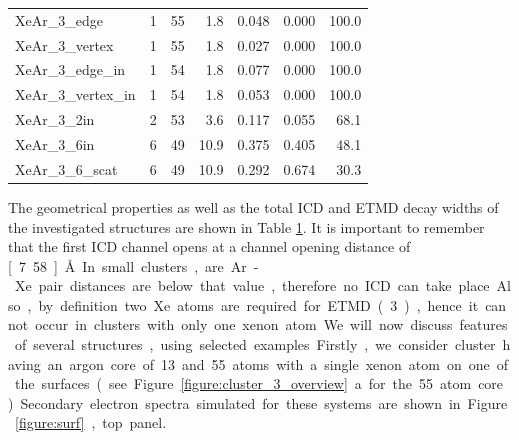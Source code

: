 \begin{table}[h]
\begin{tabular}{lrrrccr}
XeAr\_3\_edge        &      1   &     55   &  1.8  & 0.048 & 0.000 & 100.0\\ %
XeAr\_3\_vertex      &      1   &     55   &  1.8  & 0.027 & 0.000 & 100.0\\ %
XeAr\_3\_edge\_in    &      1   &     54   &  1.8  & 0.077 & 0.000 & 100.0\\ %
XeAr\_3\_vertex\_in  &      1   &     54   &  1.8  & 0.053 & 0.000 & 100.0\\ %
XeAr\_3\_2in         &      2   &     53   &  3.6  & 0.117 & 0.055 &  68.1\\ %
XeAr\_3\_6in         &      6   &     49   & 10.9  & 0.375 & 0.405 &  48.1\\ %
XeAr\_3\_6\_scat     &      6   &     49   & 10.9  & 0.292 & 0.674 &  30.3\\ %
\bottomrule
\end{tabular}
\label{table:theo_gammas}
\end{table}
%
The geometrical properties as well as the total ICD and ETMD decay widths
of the investigated structures are shown in Table \ref{table:theo_gammas}.
It is important to remember that the first ICD channel opens at a
channel opening distance of \unit[7.58]{\AA}. In small
clusters, are Ar-Xe pair distances are below that value, therefore 
no ICD can take place. Also, by definition two Xe atoms are
required for ETMD(3), hence it cannot occur in clusters with only one xenon atom.
%

We will now discuss features of several structures, using selected examples.

Firstly, we consider cluster having an argon core of 13 and 55 atoms with a single xenon
atom on one of the surfaces (see Figure \ref{figure:cluster_3_overview}a
for the 55 atom core).
Secondary electron spectra simulated for these systems are shown in Figure \ref{figure:surf}, top panel.

